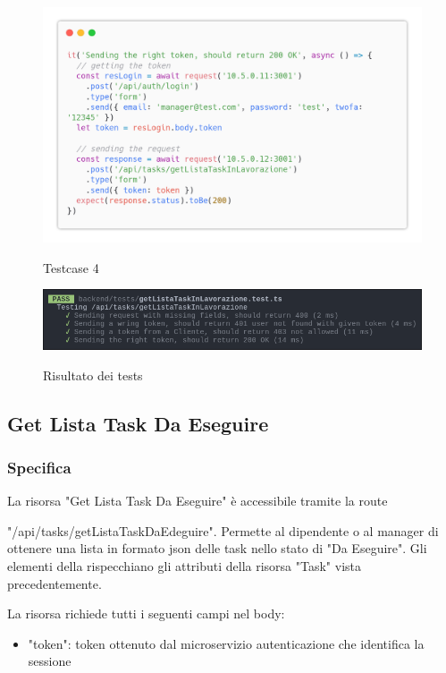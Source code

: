 \documentclass{report}
\begin{document}
\begin{figure}[H]
	\centering\includegraphics[width=1\textwidth]{images/code_in_lavorazione_test4.png}

	Testcase 4
\end{figure}

\begin{figure}[H]
	\centering\includegraphics[width=1\textwidth]{images/jest_in_lavorazione.png}

	Risultato dei tests
\end{figure}

\subsection{Get Lista Task Da Eseguire}
\subsubsection*{Specifica}

La risorsa "Get Lista Task Da Eseguire" è accessibile tramite la route

"/api/tasks/getListaTaskDaEdeguire". Permette al dipendente o al manager di ottenere una lista in formato json delle task nello stato di "Da Eseguire". Gli elementi della rispecchiano gli attributi della risorsa "Task" vista precedentemente.

La risorsa richiede tutti i seguenti campi nel body:
\begin{itemize}
	\item "token": token ottenuto dal microservizio autenticazione che identifica la sessione
\end{itemize}
\end{document}
